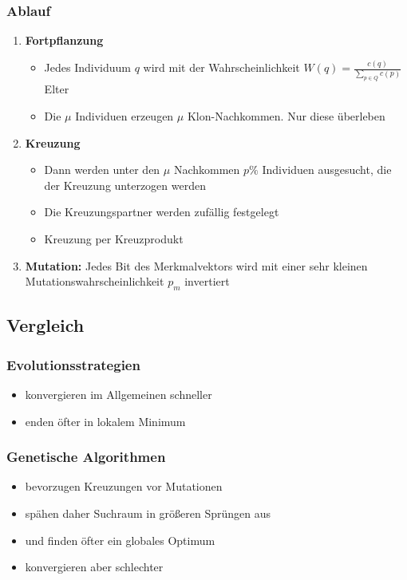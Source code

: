 \subsubsection{Ablauf}
\begin{enumerate}
	\item \textbf{Fortpflanzung}
	\begin{itemize}
		\item Jedes Individuum \(q\) wird mit der Wahrscheinlichkeit \(W(q) = \frac{c(q)}{\sum_{p \in Q}c(p)}\) Elter
		\item Die \(\mu\) Individuen erzeugen \(\mu\) Klon-Nachkommen. Nur diese überleben
	\end{itemize}
	\item \textbf{Kreuzung}
	\begin{itemize}
		\item Dann werden unter den \(\mu\) Nachkommen \(p\%\) Individuen ausgesucht, die der Kreuzung unterzogen werden
		\item Die Kreuzungspartner werden zufällig festgelegt
		\item Kreuzung per Kreuzprodukt
	\end{itemize}
	\item \textbf{Mutation:} Jedes Bit des Merkmalvektors wird mit einer sehr kleinen Mutationswahrscheinlichkeit \(p_m\) invertiert
\end{enumerate}


\subsection{Vergleich}

\subsubsection{Evolutionsstrategien}
\begin{itemize}
	\item konvergieren im Allgemeinen schneller
	\item enden öfter in lokalem Minimum
\end{itemize}

\subsubsection{Genetische Algorithmen}
\begin{itemize}
	\item bevorzugen Kreuzungen vor Mutationen
	\item spähen daher Suchraum in größeren Sprüngen aus
	\item und finden öfter ein globales Optimum
	\item konvergieren aber schlechter
\end{itemize}


